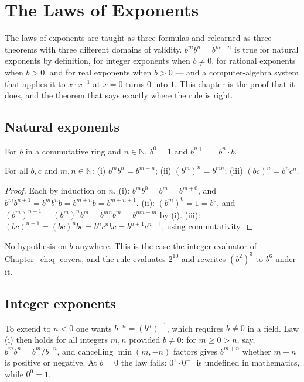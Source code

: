 \chapter{The Laws of Exponents}\label{ch:exp}

The laws of exponents are taught as three formulas and relearned as three theorems with three
different domains of validity. $b^m b^n = b^{m+n}$ is true for natural exponents by definition,
for integer exponents when $b \neq 0$, for rational exponents when $b > 0$, and for real
exponents when $b > 0$ --- and a computer-algebra system that applies it to $x \cdot x^{-1}$ at
$x = 0$ turns $0$ into $1$. This chapter is the proof that it does, and the theorem that says
exactly where the rule is right.

\section{Natural exponents}

\begin{definition}
  For $b$ in a commutative ring and $n \in \mathbb{N}$, $b^0 = 1$ and $b^{n+1} = b^n \cdot b$.
\end{definition}

\begin{theorem}
  For all $b, c$ and $m, n \in \mathbb{N}$:
  (i) $b^m b^n = b^{m+n}$; (ii) $(b^m)^n = b^{mn}$; (iii) $(bc)^n = b^n c^n$.
\end{theorem}
\begin{proof}
  Each by induction on $n$. (i): $b^m b^0 = b^m = b^{m+0}$, and $b^m b^{n+1} = b^m b^n b =
  b^{m+n} b = b^{m+n+1}$. (ii): $(b^m)^0 = 1 = b^0$, and $(b^m)^{n+1} = (b^m)^n b^m = b^{mn} b^m =
  b^{mn + m}$ by (i). (iii): $(bc)^{n+1} = (bc)^n bc = b^n c^n b c = b^{n+1} c^{n+1}$, using
  commutativity.
\end{proof}

No hypothesis on $b$ anywhere. This is the case the integer evaluator of Chapter~\ref{ch:q}
covers, and the rule  evaluates $2^{10}$ and rewrites $(b^2)^3$ to $b^6$ under it.

\section{Integer exponents}

To extend to $n < 0$ one wants $b^{-n} = (b^n)^{-1}$, which requires $b \neq 0$ in a field.
Law (i) then holds for all integers $m, n$ provided $b \neq 0$: for $m \ge 0 > n$, say, $b^m
b^{n} = b^m / b^{-n}$, and cancelling $\min(m, -n)$ factors gives $b^{m+n}$ whether $m + n$ is
positive or negative. At $b = 0$ the law fails: $0^1 \cdot 0^{-1}$ is undefined in mathematics,
while $0^0 = 1$.

